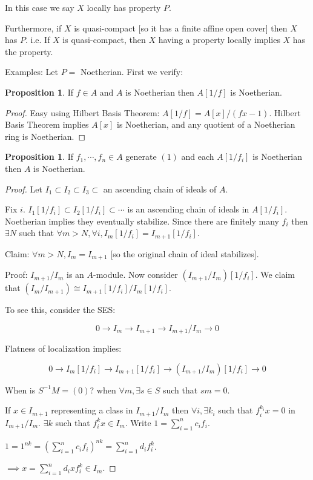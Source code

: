 \documentclass{article}
\theoremstyle{definition}
\newtheorem{proposition}[theorem]{Proposition}
\begin{document}
    In this case we say \(X\) locally has property \(P\).

    Furthermore, if \(X\) is quasi-compact [so it has a finite affine open cover] then \(X\) has \(P\). i.e. If \(X\) is quasi-compact, then \(X\) having a property locally implies \(X\) has the property.

    Examples: Let \(P =\) Noetherian. First we verify:

    \begin{proposition}
        If \(f\in A\) and \(A\) is Noetherian then \(A[1 / f]\) is Noetherian. 
    \end{proposition}

    \begin{proof}
        Easy using Hilbert Basis Theorem: \(A [ 1 / f] = A [x] / (fx - 1)\). Hilbert Basis Theorem implies \(A[x]\) is Noetherian, and any quotient of a Noetherian ring is Noetherian.
    \end{proof}

    \begin{proposition}
        If \(f_1, \cdots , f_n \in A\) generate \((1)\) and each \(A[1 / f_i]\) is Noetherian then \(A\) is Noetherian.
    \end{proposition}

    \begin{proof}
        Let \(I_1 \subset I_2 \subset I_3 \subset\) an ascending chain of ideals of \(A\).

        Fix \(i\). \(I_1[1 / f_i] \subset I_2[1 / f_i] \subset \cdots\) is an ascending chain of ideals in \(A [1 / f_i]\). Noetherian implies they eventually stabilize. Since there are finitely many \(f_i\) then \(\exists N\) such that \(\forall m > N, \forall i, I_m [1 / f_i] = I_{m+1} [1 / f_i]\).

        Claim: \(\forall m > N, I_m = I_{m+1}\) [so the original chain of ideal stabilizes].

        Proof: \(I_{m+1} / I_m\) is an \(A\)-module. Now consider \((I_{m+1} / I_m) [1 / f_i]\). We claim that \((I_m / I_{m+1}) \cong I_{m+1} [1 / f_i] / I_m [1 / f_i]\).
        
        To see this, consider the SES:

        \[
            0 \to I_m \to I_{m+1} \to I_{m+1} / I_m \to 0
        \]

        Flatness of localization implies:

        \[
            0 \to I_m [1 / f_i] \to I_{m+1} [1 / f_i] \to (I_{m+1} / I_m) [1 / f_i] \to 0
        \]

        When is \(S ^{-1} M = (0)\)? when \(\forall m, \exists s \in S\) such that \(sm = 0\).

        If \(x\in I_{m+1}\) representing a class in \(I_{m+1} / I_m\) then \(\forall i, \exists k_i\) such that \(f_i^{k_i} x = 0\) in \(I_{m+1} / I_m\). \(\exists k\) such that \(f_i^k x \in I_m\). Write \(1 = \sum_{i=1}^n c_i f_i\).

        \(1 = 1^{nk} = \left( \sum_{i=1}^n c_i f_i \right)^{nk} = \sum_{i=1}^n d_i f_i^k\).
        
        \(\implies x = \sum_{i=1}^n d_i x f_i^k \in I_m\).

    \end{proof}
\end{document}
